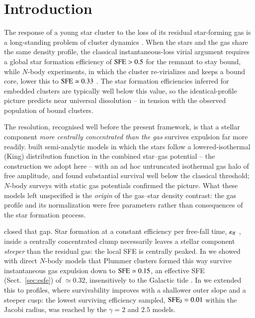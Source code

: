 \documentclass{aa}
\newcommand{\sfe}{{\rm SFE}}
\newcommand{\effE}{\varepsilon_{\rm ff}}
\begin{document}
\section{Introduction}

The response of a young star cluster to the loss of its residual
star-forming gas is a long-standing problem of cluster dynamics
\citep{Hills1980,Lada2003,BoilyKroupa2003a,BaumgardtKroupa2007}. When
the stars and the gas share the same density profile, the classical
instantaneous-loss virial argument requires a global star formation
efficiency of $\sfe>0.5$ for the remnant to stay bound, while $N$-body
experiments, in which the cluster re-virializes and keeps a bound core,
lower this to $\sfe\simeq0.33$
\citep{BoilyKroupa2003a,BoilyKroupa2003b,BaumgardtKroupa2007}. The
star formation efficiencies inferred for embedded clusters are typically
well below this value, so the identical-profile picture predicts near
universal dissolution -- in tension with the observed population of
bound clusters.

The resolution, recognised well before the present framework, is that a
stellar component \emph{more centrally concentrated than the gas}
survives expulsion far more readily. \citet{Adams2000} built
semi-analytic models in which the stars follow a lowered-isothermal
(King) distribution function in the combined star--gas potential -- the
construction we adopt here -- with an ad hoc untruncated isothermal gas
halo of free amplitude, and found substantial survival well below the
classical threshold; $N$-body surveys with static gas potentials
\citep{Adams2006,ProszkowAdams2009} confirmed the picture. What these
models left unspecified is the \emph{origin} of the gas--star density
contrast: the gas profile and its normalization were free parameters
rather than consequences of the star formation process.

\citet{Parmentier2013} closed that gap. Star formation at a constant
efficiency per free-fall time, $\effE$ \citep{KrumholzMcKee2005}, inside
a centrally concentrated clump necessarily leaves a stellar component
\emph{steeper} than the residual gas: the local SFE is centrally peaked.
In \citet[hereafter S17]{Shukirgaliyev2017} we showed with direct
$N$-body models that Plummer clusters formed this way survive
instantaneous gas expulsion down to $\sfe\simeq0.15$, an effective SFE
(Sect.~\ref{sec:esfe}) of $\simeq0.32$, insensitively to the Galactic
tide \citep{Shukirgaliyev2019}. In
\citet[hereafter S21]{Shukirgaliyev2021} we extended this to
\citet{Dehnen1993} profiles, where survivability improves with a
shallower outer slope and a steeper cusp: the lowest surviving efficiency
sampled, $\sfe_{\rm J}=0.01$ within the Jacobi radius, was reached by the
$\gamma=2$ and $2.5$ models.
\end{document}

